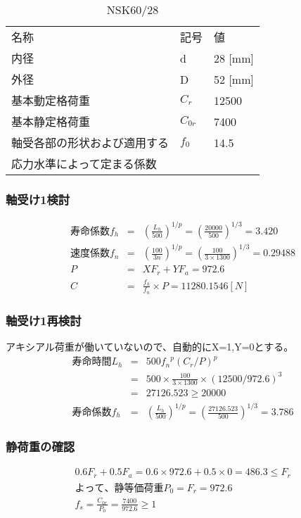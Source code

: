 \begin{table}[htb]
\begin{center}
  \caption{NSK60/28}
  \begin{tabular}{lll} \hline
名称&記号&値\\
内径& d &28 [mm]\\
外径& D &52 [mm]\\
基本動定格荷重&$C_{r}$&12500\\
基本静定格荷重&$C_{0r}$&7400\\
軸受各部の形状および適用する&$f_0$&14.5\\
応力水準によって定まる係数&&\\
\hline
  \end{tabular}
\end{center}
\end{table}


\subsubsection{軸受け1検討}
\begin{eqnarray}
寿命係数f_h &=& \left( \frac{L_h}{500} \right)^{1/p} = \left( \frac{20000}{500} \right)^{1/3} = 3.420\\
速度係数f_n &=& \left( \frac{100}{3n} \right)^{1/p} = \left( \frac{100}{3 \times 1300} \right)^{1/3} = 0.29488\\
P &=& XF_r+YF_a = 972.6\\
C &=& \frac{f_h}{f_n} \times P = 11280.1546[N]
\end{eqnarray}

\subsubsection{軸受け1再検討}
アキシアル荷重が働いていないので、自動的にX=1,Y=0とする。
\begin{eqnarray}
寿命時間L_h &=& 500{f_n}^p(C_r/P)^p\\
           &=& 500 \times \frac{100}{3 \times 1300} \times (12500/972.6)^3\\
           &=& 27126.523 \geq 20000\\
寿命係数f_h &=& \left( \frac{L_h}{500} \right)^{1/p} = \left( \frac{27126.523}{500} \right)^{1/3} = 3.786
\end{eqnarray}

\subsubsection{静荷重の確認}
\begin{eqnarray}
0.6F_r+0.5F_a=0.6 \times 972.6 + 0.5 \times 0 = 486.3 \leq F_r\\
よって、静等価荷重P_0 = F_r=972.6\\
f_s = \frac{C_{0r}}{P_0} = \frac{7400}{972.6}\geq 1
\end{eqnarray}

